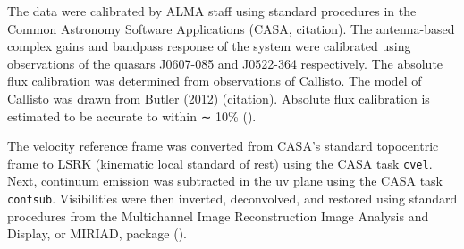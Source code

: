 The data were calibrated by ALMA staff using standard procedures in the Common Astronomy Software Applications (CASA, citation). The antenna-based complex gains and bandpass response of the system were calibrated using observations of the quasars J0607-085 and J0522-364 respectively. The absolute flux calibration was determined from observations of Callisto. The model of Callisto was drawn from Butler (2012) (citation). Absolute flux calibration is estimated to be accurate to within ∼ 10\% (\citet{mann_alma_2014}).

The velocity reference frame was converted from CASA's standard topocentric frame to LSRK (kinematic local standard of rest) using the CASA task \texttt{cvel}. Next, continuum emission was subtracted in the uv plane using the CASA task \texttt{contsub}. Visibilities were then inverted, deconvolved, and restored using standard procedures from the Multichannel Image Reconstruction Image Analysis and Display, or MIRIAD, package (\citet{rj_sault_astronomical_1995}).






